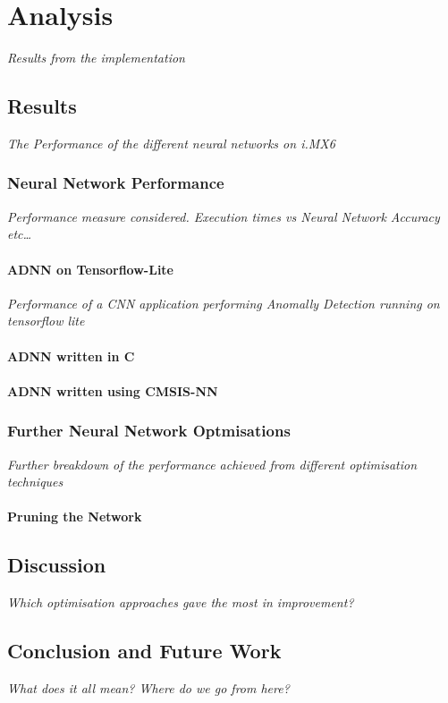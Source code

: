 \part{Analysis}
\textit{Results from the implementation}

\chapter{Results}
\textit{The Performance of the different neural networks on i.MX6}

\section{Neural Network Performance}
\textit{Performance measure considered. Execution times vs Neural Network Accuracy etc\dots}

\subsection{ADNN on Tensorflow-Lite}
\textit{Performance of a CNN application performing Anomally Detection running on tensorflow lite}

\subsection{ADNN written in C}
\subsection{ADNN written using CMSIS-NN}

\section{Further Neural Network Optmisations}
\textit{Further breakdown of the performance achieved from different optimisation techniques}
\subsection{Pruning the Network}

\chapter{Discussion}
\textit{Which optimisation approaches gave the most in improvement?}

\chapter{Conclusion and Future Work}
\textit{What does it all mean? Where do we go from here?}
